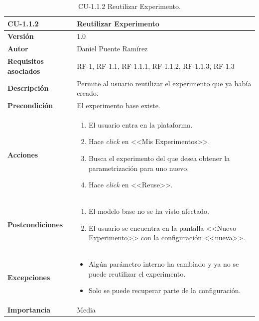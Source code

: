 \begin{table}[p]
\centering
\begin{tabularx}{\linewidth}{ p{} p{} }
\toprule
\textbf{CU-1.1.2} & \textbf{Reutilizar Experimento}\\
\toprule
\textbf{Versión} & 1.0\\
\textbf{Autor} & Daniel Puente Ramírez\\
\textbf{Requisitos asociados} & RF-1, RF-1.1, RF-1.1.1, RF-1.1.2, RF-1.1.3, RF-1.3\\
\textbf{Descripción} & Permite al usuario reutilizar el experimento que ya había creado.\\
\textbf{Precondición} & El experimento base existe.\\
\textbf{Acciones} &
\begin{enumerate}
\def\labelenumi{\arabic{enumi}.}
\tightlist
\item El usuario entra en la plataforma.
\item Hace \textit{click} en <<Mis Experimentos>>.
\item Busca el experimento del que desea obtener la parametrización para uno nuevo.
\item Hace \textit{click} en <<Reuse>>.
\end{enumerate}\\
\textbf{Postcondiciones} & 
\begin{enumerate}
\tightlist
\item El modelo base no se ha visto afectado.
\item El usuario se encuentra en la pantalla <<Nuevo Experimento>> con la configuración <<nueva>>.
\end{enumerate}\\
\textbf{Excepciones} & 
\begin{itemize}
\tightlist
\item Algún parámetro interno ha cambiado y ya no se puede reutilizar el experimento.
\item Solo se puede recuperar parte de la configuración.
\end{itemize}\\
\textbf{Importancia} & Media \\
\bottomrule
\end{tabularx}
\caption{CU-1.1.2 Reutilizar Experimento.}
\end{table}

